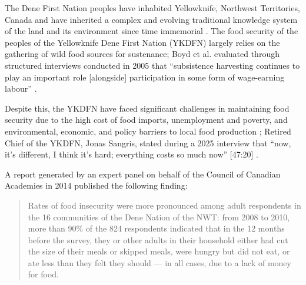 \documentclass{report}
\begin{document}
\hspace{24pt} The Dene First Nation peoples have inhabited Yellowknife, Northwest Territories, Canada and have inherited a complex and evolving traditional knowledge system of the land and its environment since time immemorial \parencite{lorecapturingtraditional}.
The food security of the peoples of the Yellowknife Dene First Nation (YKDFN) largely relies on the gathering of wild food sources for sustenance;
Boyd et al. evaluated through structured interviews conducted in 2005 that ``subsistence harvesting continues to play an important role [alongside] participation in some form of wage-earning labour'' \parencite[268]{socialculturalcapital}.

\hspace{24pt}Despite this, the YKDFN have faced significant challenges in maintaining food security due to the high cost of food imports, unemployment and poverty, and environmental, economic, and policy barriers to local food production \parencite{resilientcommunities}; Retired Chief of the YKDFN, Jonas Sangris, stated during a 2025 interview that ``now, it's different, I think it's hard; everything costs so much now'' [47:20] \parencite{jonassangris}.

\clearpage

A report generated by an expert panel on behalf of the Council of Canadian Academies in 2014 published the following finding:

\begin{quote}
  Rates of food insecurity were more pronounced among adult respondents in the 16 communities of the Dene Nation of the NWT: from 2008 to 2010, more than 90\% of the 824 respondents indicated that in the 12 months before the survey, they or other adults in their household either had cut the size of their meals or skipped meals, were hungry but did not eat, or ate less than they felt they should — in all cases, due to a lack of money for food. \parencite[42]{aboriginalfoodsecurity}
\end{quote}



\end{document}
